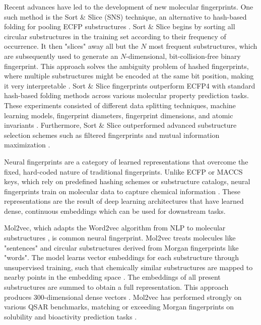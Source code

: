 Recent advances have led to the development of new molecular fingerprints. One such method is the Sort \& Slice (SNS) technique, an alternative to hash-based folding for pooling ECFP substructures \citep{sns}. Sort \& Slice begins by sorting all circular substructures in the training set according to their frequency of occurrence. It then "slices" away all but the $N$ most frequent substructures, which are subsequently used to generate an $N$-dimensional, bit-collision-free binary fingerprint. This approach solves the ambiguity problem of hashed fingerprints, where multiple substructures might be encoded at the same bit position, making it very interpretable \citep{sns}. Sort \& Slice fingerprints outperform ECFP4 with standard hash-based folding methods across various molecular property prediction tasks. These experiments consisted of different data splitting techniques, machine learning models, fingerprint diameters, fingerprint dimensions, and atomic invariants \citep{sns}. Furthermore, Sort \& Slice outperformed advanced substructure selection schemes such as filtered fingerprints and mutual information maximization \citep{sns}. 


Neural fingerprints are a category of learned  representations that overcome the fixed, hard-coded nature of traditional fingerprints. Unlike ECFP or MACCS keys, which rely on predefined hashing schemes or substructure catalogs, neural fingerprints train on molecular data to capture chemical information \citep{Jaeger2018, Chithrananda2020}. These representations are the result of deep learning architectures that have learned dense, continuous embeddings which can be used for downstream tasks. 

Mol2vec, which adapts the Word2vec algorithm from NLP to molecular substructures \citep{Jaeger2018}, is common neural fingerprint. Mol2vec treats molecules like "sentences" and circular substructures derived from Morgan fingerprints like "words". The model learns vector embeddings for each substructure through unsupervised training, such that chemically similar substructures are mapped to nearby points in the embedding space \citep{Jaeger2018}. The embeddings of all present substructures are summed to obtain a full representation. This approach produces 300-dimensional dense vectors \citep{Jaeger2018}. Mol2vec has performed strongly on various QSAR benchmarks, matching or exceeding Morgan fingerprints on solubility and bioactivity prediction tasks \citep{Jaeger2018}.

